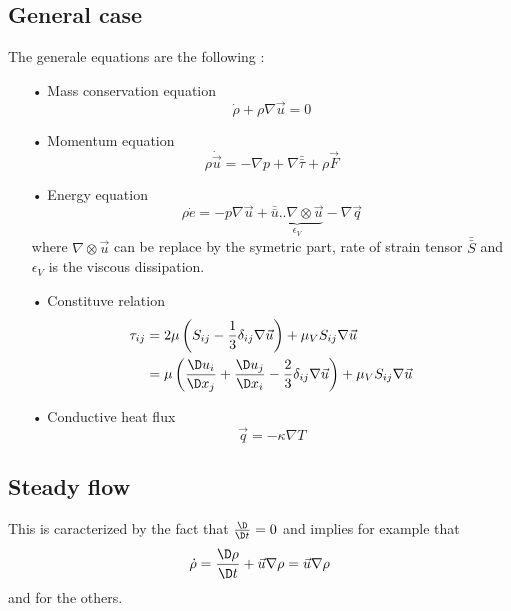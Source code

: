 	\subsection{General case}
		The generale equations are the following : 
		\begin{itemize}
			\item[•] Mass conservation equation 
			\begin{equation}
				\dot{\rho} + \rho \nabla \vec{u} = 0 
			\end{equation}
			
			\item[•] Momentum equation
			\begin{equation}
				\rho \dot{\vec{u}} = - \nabla p + \nabla \bar{\bar{\tau}} + \rho \vec{F}
			\end{equation}
			
			\item[•] Energy equation
			\begin{equation}
				\rho \dot{e} = - p \nabla \vec{u} + \underbrace{\bar{\bar{u}} .. \nabla \otimes \vec{u}}_{\epsilon _V} - \nabla \vec{q}
			\end{equation}
			where $\nabla \otimes \vec{u}$ can be replace by the symetric part, rate of strain tensor $\bar{\bar{S}}$ and $\epsilon _V$ is the viscous dissipation. \\
			
			\item[•] Constituve relation
			\begin{equation}
			\begin{aligned}
				\tau _{ij} &= 2\mu \left( S _{ij} - \frac{1}{3}\delta_{ij}\nabla \vec{u} \right) + \mu _V S_{ij}\nabla \vec{u}\\
				&= \mu \left( \frac{\D u_i}{\D x_j} + \frac{\D u_j}{\D x_i} - \frac{2}{3}\delta _{ij}\nabla \vec{u} \right) + \mu _V S_{ij}\nabla \vec{u}
			\end{aligned}
			\label{eq:1.83}
			\end{equation}
			
			\item[•] Conductive heat flux 
			\begin{equation}
				\vec{q} = -\kappa \nabla T
			\end{equation}
		\end{itemize}
		
	\subsection{Steady flow} 
		This is caracterized by the fact that $\frac{\D }{\D t} = 0$ and implies for example that 
		\begin{equation}
			\dot{\rho} = \frac{\D \rho}{\D t} + \vec{u} \nabla \rho = \vec{u} \nabla \rho
		\end{equation}
		and for the others. 
		
